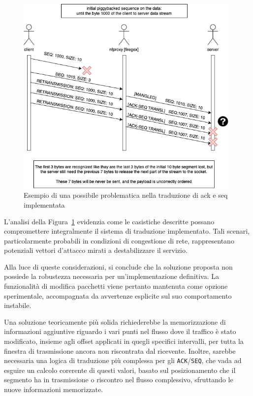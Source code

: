 \begin{figure}[H]
    \centering
    \includegraphics[width=0.98\textwidth]{images/chapter3/TCP_ack_seq_transl_failure.drawio.png}
    \caption{Esempio di una possibile problematica nella traduzione di ack e seq implementata}\label{fig:tcp_ack_seq_transl_failure}
\end{figure}

L'analisi della Figura~\ref{fig:tcp_ack_seq_transl_failure} evidenzia come le casistiche descritte possano compromettere integralmente il sistema di traduzione implementato. Tali scenari, particolarmente probabili in condizioni di congestione di rete, rappresentano potenziali vettori d'attacco mirati a destabilizzare il servizio.

Alla luce di queste considerazioni, si conclude che la soluzione proposta non possiede la robustezza necessaria per un'implementazione definitiva.
La funzionalità di modifica pacchetti viene pertanto mantenuta come opzione sperimentale, accompagnata da avvertenze esplicite sul suo comportamento instabile.

Una soluzione teoricamente più solida richiederebbe la memorizzazione di informazioni aggiuntive riguardo i vari punti nel flusso dove il traffico è stato modificato, insieme agli offset applicati in quegli specifici intervalli, per tutta la finestra di trasmissione ancora non riscontrata dal ricevente. Inoltre, sarebbe necessaria una logica di traduzione più complessa per gli \texttt{ACK}/\texttt{SEQ}, che vada ad esguire un calcolo corerente di questi valori, basato sul posizionamento che il segmento ha in trasmissione o riscontro nel flusso complessivo, sfruttando le nuove informazioni memorizzate.

